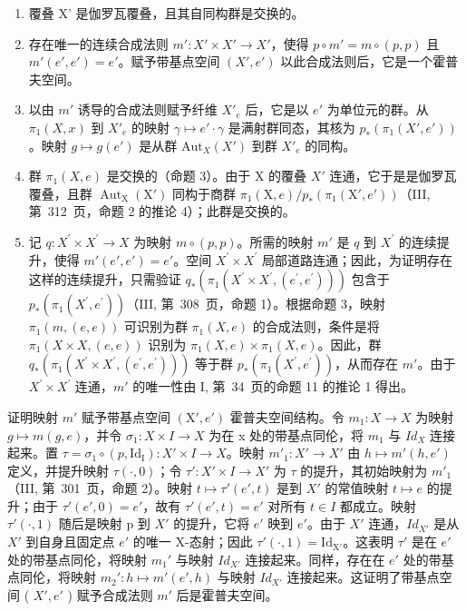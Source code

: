 \begin{enumerate}
\def\labelenumi{\alph{enumi})}
\item
  覆叠 X' 是伽罗瓦覆叠，且其自同构群是交换的。
\item
  存在唯一的连续合成法则 \(m' \colon X' \times X' \to X'\)，使得 \(p \circ m' = m \circ (p, p)\) 且 \(m'(e', e') = e'\)。赋予带基点空间 \((X', e')\) 以此合成法则后，它是一个霍普夫空间。
\item
  以由 \(m'\) 诱导的合成法则赋予纤维 \(X'_e\) 后，它是以 \(e'\) 为单位元的群。从 \(\pi_1(X, x)\) 到 \(X'_e\) 的映射 \(\gamma \mapsto e' \cdot \gamma\) 是满射群同态，其核为 \(p_*(\pi_1(X', e'))\)。映射 \(g \mapsto g(e')\) 是从群 \(\text{Aut}_X(X')\) 到群 \(X'_e\) 的同构。
\item
  群 \(\pi_{1}(X,e)\) 是交换的（命题 3）。由于 X 的覆叠 \(X'\) 连通，它于是是伽罗瓦覆叠，且群 \(\operatorname{Aut}_{\mathrm{X}}(\mathrm{X}')\) 同构于商群 \(\pi_{1}(\mathrm{X},e)/p_{*}(\pi_{1}(\mathrm{X}',e'))\)（III, 第~312~页，命题 2 的推论 4）；此群是交换的。
\item
  记 \(q\colon X^{\prime}\times X^{\prime}\to X\) 为映射 \(m\circ (p,p)\)。所需的映射 \(m'\) 是 \(q\) 到 \(X^{\prime}\) 的连续提升，使得 \(m'(e',e') = e'\)。空间 \(X^{\prime}\times X^{\prime}\) 局部道路连通；因此，为证明存在这样的连续提升，只需验证 \(q_{*}(\pi_{1}(X^{\prime}\times X^{\prime},(e^{\prime},e^{\prime})))\) 包含于 \(p_{*}(\pi_{1}(X^{\prime},e^{\prime}))\)（III, 第~308~页，命题 1）。根据命题 3，映射 \(\pi_1(m,(e,e))\) 可识别为群 \(\pi_1(X,e)\) 的合成法则，条件是将 \(\pi_1(X\times X,(e,e))\) 识别为 \(\pi_1(X,e)\times \pi_1(X,e)\)。因此，群 \(q_{*}(\pi_{1}(X^{\prime}\times X^{\prime},(e^{\prime},e^{\prime})))\) 等于群 \(p_{*}(\pi_{1}(X^{\prime},e^{\prime}))\)，从而存在 \(m'\)。由于 \(X^{\prime}\times X^{\prime}\) 连通，\(m'\) 的唯一性由 I, 第~34~页的命题 11 的推论 1 得出。
\end{enumerate}

证明映射 \(m'\) 赋予带基点空间 \((\mathrm{X}', e')\) 霍普夫空间结构。令 \(m_1 \colon X \to X\) 为映射 \(g \mapsto m(g, e)\)，并令 \(\sigma_1 \colon X \times I \to X\) 为在 x 处的带基点同伦，将 \(m_1\) 与 \(Id_X\) 连接起来。置 \(\tau = \sigma_1 \circ (p, \mathrm{Id_I}) \colon X' \times I \to X\)。映射 \(m'_1 \colon X' \to X'\) 由 \(h \mapsto m'(h, e')\) 定义，并提升映射 \(\tau(\cdot, 0)\)；令 \(\tau' \colon X' \times I \to X'\) 为 \(\tau\) 的提升，其初始映射为 \(m'_1\)（III, 第~301~页，命题 2）。映射 \(t \mapsto \tau'(e', t)\) 是到 \(X'\) 的常值映射 \(t \mapsto e\) 的提升；由于 \(\tau'(e', 0) = e'\)，故有 \(\tau'(e', t) = e'\) 对所有 \(t \in I\) 都成立。映射 \(\tau'(\cdot, 1)\) 随后是映射 p 到 \(X'\) 的提升，它将 \(e'\) 映到 \(e'\)。由于 \(X'\) 连通，\(Id_{X'}\) 是从 \(X'\) 到自身且固定点 \(e'\) 的唯一 X-态射；因此 \(\tau'(\cdot,1)=\mathrm{Id}_{\mathrm{X}'}\)。这表明 \(\tau'\) 是在 \(e'\) 处的带基点同伦，将映射 \(m_{1}'\) 与映射 \(Id_{X'}\) 连接起来。同样，存在在 \(e'\) 处的带基点同伦，将映射 \(m_{2}'\colon h\mapsto m'(e',h)\) 与映射 \(Id_{X'}\) 连接起来。这证明了带基点空间 ( \(X',e'\) ) 赋予合成法则 \(m'\) 后是霍普夫空间。

